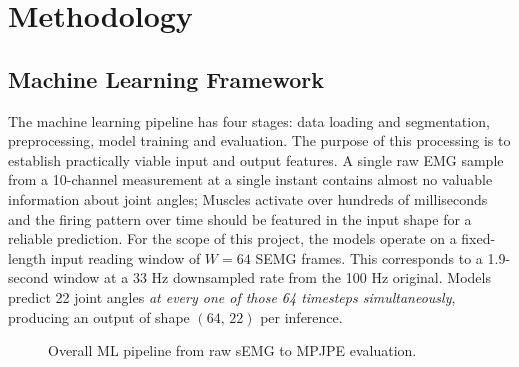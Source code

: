 \documentclass[11pt]{article}
\begin{document}
\section{Methodology}

\subsection{Machine Learning Framework}

The machine learning pipeline has four stages: data loading and segmentation, preprocessing, model training and evaluation. The purpose of this processing is to establish practically viable input and output features. A single raw EMG sample from a 10-channel measurement at a single instant contains almost no valuable information about joint angles; Muscles activate over hundreds of milliseconds and the firing pattern over time should be featured in the input shape for a reliable prediction. For the scope of this project, the models operate on a fixed-length input reading window of $W=64$ SEMG frames. This corresponds to a 1.9-second window at a 33 Hz downsampled rate from the 100 Hz original. Models predict 22 joint angles \emph{at every one of those 64 timesteps simultaneously}, producing an output of shape $(64,\,22)$ per inference.

\begin{figure}[H]
\centering
{}
\caption{Overall ML pipeline from raw sEMG to MPJPE evaluation.}
\label{fig:pipeline}
\end{figure}
\end{document}
